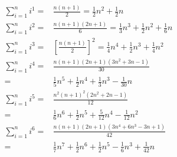 \begin{eqnarray*}
\sum_{i=1}^ni^1=&\frac{n(n+1)}{2}=\frac{1}{2}n^2+\frac{1}{2}n\\
\sum_{i=1}^ni^2=&\frac{n(n+1)(2n+1)}{6}=\frac{1}{3}n^3+\frac{1}{2}n^2+\frac{1}{6}n\\
\sum_{i=1}^ni^3=&\left[\frac{n(n+1)}{2}\right]^2=\frac{1}{4}n^4+\frac{1}{2}n^3+\frac{1}{4}n^2\\
\sum_{i=1}^ni^4=&\frac{n(n+1)(2n+1)(3n^2+3n-1)}{30}\\=&\frac{1}{5}n^5+\frac{1}{2}n^4+\frac{1}{3}n^3-\frac{1}{30}n\\
\sum_{i=1}^ni^5=&\frac{n^2(n+1)^2(2n^2+2n-1)}{12}\\=&\frac{1}{6}n^6+\frac{1}{2}n^5+\frac{5}{12}n^4-\frac{1}{12}n^2\\
\sum_{i=1}^ni^6=&\frac{n(n+1)(2n+1)(3n^4+6n^3-3n+1)}{42}\\=&\frac{1}{7}n^7+\frac{1}{2}n^6+\frac{1}{2}n^5-\frac{1}{6}n^3+\frac{1}{42}n
\end{eqnarray*}
